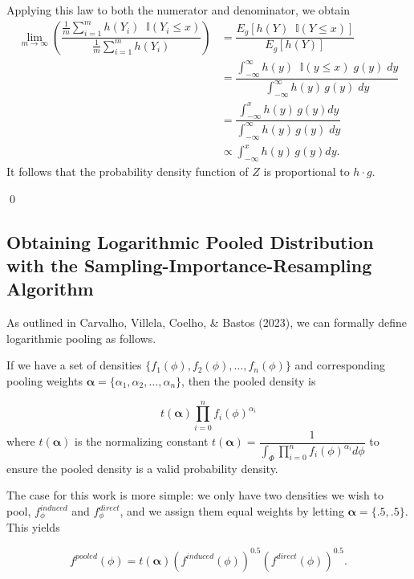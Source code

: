 \documentclass[12pt,twoside]{smiththesis}
\begin{document}
Applying this law to both the numerator and denominator, we obtain
\begin{align*}  \lim_{m \to \infty} \left( \dfrac{ \frac 1m {\sum_{i=1}^mh(Y_i) }  \;\;\mathbb{I} (Y_i \leq x) }{\frac 1m \sum_{i=1}^mh(Y_i) } \right) &= \dfrac{ E_g[ h(Y) \;\; \mathbb I (Y \leq x) ]  }{ E_g[ h(Y) ]  }\\
&= \dfrac{\int_{-\infty}^\infty h(y) \;\; \mathbb I (y \leq x) \; g(y) \; dy}{\int_{-\infty}^\infty h(y) \, g(y) \;dy}\\
&= \dfrac{\int_{-\infty}^x h(y) \, g(y) dy}{\int_{-\infty}^\infty h(y) \, g(y) \;dy}\\
&\propto \int_{-\infty}^x h(y) \, g(y) dy. 
\end{align*}
It follows that the probability density function of \(Z\) is proportional to \(h \cdot g\).

\vspace{3 mm}

\qed

\hypertarget{logpooled}{%
\subsection{Obtaining Logarithmic Pooled Distribution with the Sampling-Importance-Resampling Algorithm}\label{logpooled}}

As outlined in Carvalho, Villela, Coelho, \& Bastos (2023), we can formally define logarithmic pooling as follows.

If we have a set of densities \(\{ f_1(\phi), f_2(\phi), \ldots, f_n(\phi)\}\) and corresponding pooling weights \(\boldsymbol{\alpha}=\{\alpha_1, \alpha_2, \ldots, \alpha_n\}\), then the pooled density is

\[ t(\boldsymbol{\alpha}) \prod_{i=0}^n f_i(\phi)^{\alpha_i}\] where \(t(\boldsymbol{\alpha})\) is the normalizing constant \(t(\boldsymbol{\alpha}) = \dfrac{1}{ \int_{\Phi}\prod_{i=0}^n f_i(\phi)^{\alpha_i} d\phi}\) to ensure the pooled density is a valid probability density.

The case for this work is more simple: we only have two densities we wish to pool, \(f_\phi^{induced}\) and \(f_\phi^{direct}\), and we assign them equal weights by letting \(\boldsymbol{\alpha} = \{.5, .5\}\). This yields

\[f^{pooled}(\phi) = t(\boldsymbol \alpha) \left( f^{induced} (\phi) \right)^{0.5} \left( f^{direct} (\phi) \right)^{0.5}.\]
\end{document}
